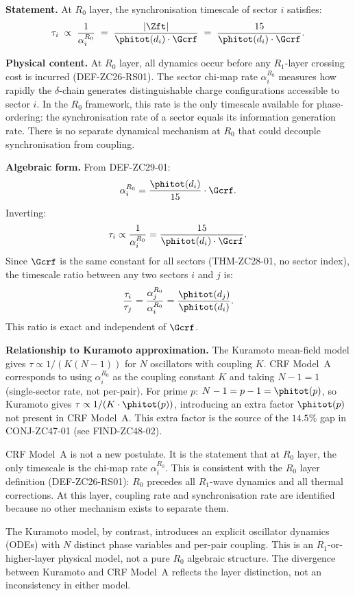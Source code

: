 \documentclass[12pt, a4paper]{article}
\begin{document}
\begin{formalbox}[title={LEM-ZC48-01: CRF Model~A ---
  $\tau_i \propto 1/\alpha_i^{R_0}$}]
\textbf{Statement.}
At $R_0$ layer, the synchronisation timescale of sector $i$
satisfies:
\begin{equation}
  \tau_i \;\propto\; \frac{1}{\alpha_i^{R_0}}
  \;=\; \frac{|\Zft|}{\phitot(d_i)\cdot\Gcrf}
  \;=\; \frac{15}{\phitot(d_i)\cdot\Gcrf}.
  \label{eq:modelA}
\end{equation}

\textbf{Physical content.}
At $R_0$ layer, all dynamics occur before any $R_1$-layer
crossing cost is incurred (DEF-ZC26-RS01).
The sector chi-map rate $\alpha_i^{R_0}$ measures how rapidly
the $\delta$-chain generates distinguishable charge configurations
accessible to sector $i$.
In the $R_0$ framework, this rate is the only timescale
available for phase-ordering: the synchronisation rate of a
sector equals its information generation rate.
There is no separate dynamical mechanism at $R_0$ that could
decouple synchronisation from coupling.

\textbf{Algebraic form.}
From DEF-ZC29-01:
\[
  \alpha_i^{R_0} = \frac{\phitot(d_i)}{15}\cdot\Gcrf.
\]
Inverting:
\[
  \tau_i \propto \frac{1}{\alpha_i^{R_0}}
  = \frac{15}{\phitot(d_i)\cdot\Gcrf}.
\]
Since $\Gcrf$ is the same constant for all sectors
(THM-ZC28-01, no sector index), the timescale ratio between
any two sectors $i$ and $j$ is:
\begin{equation}
  \frac{\tau_i}{\tau_j}
  = \frac{\alpha_j^{R_0}}{\alpha_i^{R_0}}
  = \frac{\phitot(d_j)}{\phitot(d_i)}.
  \label{eq:tauratio}
\end{equation}
This ratio is exact and independent of $\Gcrf$.

\textbf{Relationship to Kuramoto approximation.}
The Kuramoto mean-field model gives $\tau \propto 1/(K(N-1))$
for $N$ oscillators with coupling $K$.
CRF Model~A corresponds to using $\alpha_i^{R_0}$ as the
coupling constant $K$ and taking $N-1 = 1$ (single-sector
rate, not per-pair).
For prime $p$: $N-1 = p-1 = \phitot(p)$, so Kuramoto gives
$\tau \propto 1/(K \cdot \phitot(p))$, introducing an extra
factor $\phitot(p)$ not present in CRF Model~A.
This extra factor is the source of the $14.5\%$ gap in
CONJ-ZC47-01 (see FIND-ZC48-02).
\end{formalbox}

\begin{derivedbox}[title={Commentary on LEM-ZC48-01}]
CRF Model~A is not a new postulate.
It is the statement that at $R_0$ layer, the only timescale
is the chi-map rate $\alpha_i^{R_0}$.
This is consistent with the $R_0$ layer definition (DEF-ZC26-RS01):
$R_0$ precedes all $R_1$-wave dynamics and all thermal corrections.
At this layer, coupling rate and synchronisation rate are identified
because no other mechanism exists to separate them.

The Kuramoto model, by contrast, introduces an explicit
oscillator dynamics (ODEs) with $N$ distinct phase variables
and per-pair coupling.
This is an $R_1$-or-higher-layer physical model, not a
pure $R_0$ algebraic structure.
The divergence between Kuramoto and CRF Model~A reflects
the layer distinction, not an inconsistency in either model.
\end{derivedbox}
\end{document}

